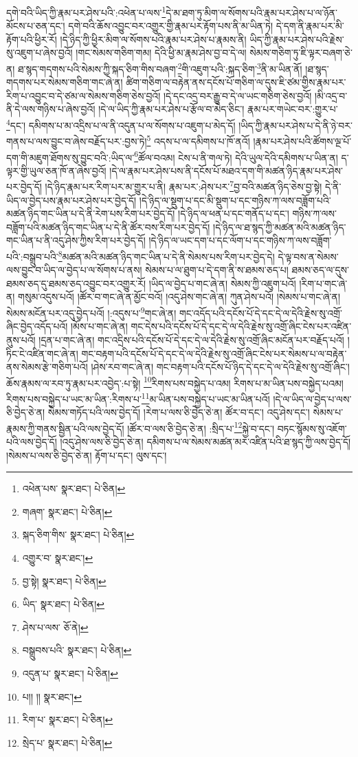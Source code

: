 དགེ་བའི་ཡིད་ཀྱི་རྣམ་པར་ཤེས་པའི་:འཕེན་པ་ལས་\footnote{འཕེན་པས་  སྣར་ཐང་།  པེ་ཅིན། }དེ་མ་ཐག་ཏུ་མིག་ལ་སོགས་པའི་རྣམ་པར་ཤེས་པ་ལ་ཉོན་མོངས་པ་ཅན་དང་། དགེ་བའི་ཆོས་འབྱུང་བར་འགྱུར་གྱི་རྣམ་པར་རྟོག་པས་ནི་མ་ཡིན་ཏེ། དེ་དག་ནི་རྣམ་པར་མི་རྟོག་པའི་ཕྱིར་རོ། །དེ་ཉིད་ཀྱི་ཕྱིར་མིག་ལ་སོགས་པའི་རྣམ་པར་ཤེས་པ་རྣམས་ནི། ཡིད་ཀྱི་རྣམ་པར་ཤེས་པའི་རྗེས་སུ་འཇུག་པ་ཞེས་བྱའོ། །གང་སེམས་གཅིག་གམ། དེའི་ཕྱི་མ་རྣམ་ཤེས་བྱ་བ་དེ་ལ། སེམས་གཅིག་ཏུ་ཇི་ལྟར་བཞག་ཅེ་ན། ཐ་སྙད་གདགས་པའི་སེམས་ཀྱི་སྐད་ཅིག་གིས་བཞག་\footnote{གཞག་  སྣར་ཐང་།  པེ་ཅིན། }གི་འཇུག་པའི་:སྐད་ཅིག་\footnote{སྐད་ཅིག་གིས་  སྣར་ཐང་།  པེ་ཅིན། }ནི་མ་ཡིན་ནོ། །ཐ་སྙད་གདགས་པར་སེམས་གཅིག་གང་ཞེ་ན། ཚིག་གཅིག་ལ་བརྟེན་ནས་དངོས་པོ་གཅིག་ལ་དུས་ཇི་ཙམ་གྱིས་རྣམ་པར་རིག་པ་འབྱུང་བ་དེ་ཙམ་ལ་སེམས་གཅིག་ཅེས་བྱའོ། །དེ་དང་འདྲ་བར་རྒྱུ་བ་དེ་ལ་ཡང་གཅིག་ཅེས་བྱའོ། །མི་འདྲ་བ་ནི་དེ་ལས་གཉིས་པ་ཞེས་བྱའོ། །དེ་ལ་ཡིད་ཀྱི་རྣམ་པར་ཤེས་པ་རྩོལ་བ་མེད་ཅིང་། རྣམ་པར་གཡེང་བར་:གྱུར་པ་\footnote{འགྱུར་བ་  སྣར་ཐང་། }དང་། དམིགས་པ་མ་འདྲིས་པ་ལ་ནི་འདུན་པ་ལ་སོགས་པ་འཇུག་པ་མེད་དོ། །ཡིད་ཀྱི་རྣམ་པར་ཤེས་པ་དེ་ནི་ཉེ་བར་གནས་པ་ལས་བྱུང་བ་ཞེས་བརྗོད་པར་:བྱས་ཏེ།\footnote{བྱ་སྟེ།  སྣར་ཐང་།  པེ་ཅིན། } འདས་པ་ལ་དམིགས་པ་ཁོ་ནའོ། །རྣམ་པར་ཤེས་པའི་ཚོགས་ལྔ་པོ་དག་གི་མཇུག་ཐོགས་སུ་བྱུང་བའི་:ཡིད་ལ་\footnote{ཡིད་  སྣར་ཐང་།  པེ་ཅིན། }ཚོལ་བའམ། ངེས་པ་ནི་གལ་ཏེ། དེའི་ཡུལ་དེའི་དམིགས་པ་ཡིན་ན། ད་ལྟར་གྱི་ཡུལ་ཅན་ཁོ་ན་ཞེས་བྱའོ། །དེ་ལ་རྣམ་པར་ཤེས་པས་ནི་དངོས་པོ་མཐའ་དག་གི་མཚན་ཉིད་རྣམ་པར་ཤེས་པར་བྱེད་དོ། །དེ་ཉིད་རྣམ་པར་རིག་པར་མ་གྱུར་པ་ནི། རྣམ་པར་:ཤེས་པར་\footnote{ཤེས་པ་ལས་  ཅོ་ནེ། }བྱ་བའི་མཚན་ཉིད་ཅེས་བྱ་སྟེ། དེ་ནི་ཡིད་ལ་བྱེད་པས་རྣམ་པར་ཤེས་པར་བྱེད་དོ། །དེ་ཉིད་ལ་སྡུག་པ་དང་མི་སྡུག་པ་དང་གཉིས་ཀ་ལས་བཟློག་པའི་མཚན་ཉིད་གང་ཡིན་པ་དེ་ནི་རེག་པས་རིག་པར་བྱེད་དོ། །དེ་ཉིད་ལ་ཕན་པ་དང་གནོད་པ་དང་། གཉིས་ཀ་ལས་བཟློག་པའི་མཚན་ཉིད་གང་ཡིན་པ་དེ་ནི་ཚོར་བས་རིག་པར་བྱེད་དོ། །དེ་ཉིད་ལ་ཐ་སྙད་ཀྱི་མཚན་མའི་མཚན་ཉིད་གང་ཡིན་པ་ནི་འདུ་ཤེས་ཀྱིས་རིག་པར་བྱེད་དོ། །དེ་ཉིད་ལ་ཡང་དག་པ་དང་ལོག་པ་དང་གཉིས་ཀ་ལས་བཟློག་པའི་:བསྒྲུབ་པའི་\footnote{བསྒྲུབས་པའི་  སྣར་ཐང་།  པེ་ཅིན། }མཚན་མའི་མཚན་ཉིད་གང་ཡིན་པ་དེ་ནི་སེམས་པས་རིག་པར་བྱེད་དེ། དེ་ལྟ་བས་ན་སེམས་ལས་བྱུང་བ་ཡིད་ལ་བྱེད་པ་ལ་སོགས་པ་ནས། སེམས་པ་ལ་ཐུག་པ་དེ་དག་ནི་ས་ཐམས་ཅད་པ། ཐམས་ཅད་ལ་དུས་ཐམས་ཅད་དུ་ཐམས་ཅད་འབྱུང་བར་འགྱུར་རོ། །ཡིད་ལ་བྱེད་པ་གང་ཞེ་ན། སེམས་ཀྱི་འཇུག་པའོ། །རིག་པ་གང་ཞེ་ན། གསུམ་འདུས་པའོ། །ཚོར་བ་གང་ཞེ་ན་མྱོང་བའོ། །འདུ་ཤེས་གང་ཞེ་ན། ཀུན་ཤེས་པའོ། །སེམས་པ་གང་ཞེ་ན། སེམས་མངོན་པར་འདུ་བྱེད་པའོ། །:འདུས་པ་\footnote{འདུན་པ་  སྣར་ཐང་།  པེ་ཅིན། }གང་ཞེ་ན། གང་འདོད་པའི་དངོས་པོ་དེ་དང་དེ་ལ་དེའི་རྗེས་སུ་འགྲོ་ཞིང་བྱེད་འདོད་པའོ། །མོས་པ་གང་ཞེ་ན། གང་དེས་པའི་དངོས་པོ་དེ་དང་དེ་ལ་དེའི་རྗེས་སུ་འགྲོ་ཞིང་ངེས་པར་འཛིན་ནུས་པའོ། །དྲན་པ་གང་ཞེ་ན། གང་འདྲིས་པའི་དངོས་པོ་དེ་དང་དེ་ལ་དེའི་རྗེས་སུ་འགྲོ་ཞིང་མངོན་པར་བརྗོད་པའོ། །ཏིང་ངེ་འཛིན་གང་ཞེ་ན། གང་བརྟག་པའི་དངོས་པོ་དེ་དང་དེ་ལ་དེའི་རྗེས་སུ་འགྲོ་ཞིང་ངེས་པར་སེམས་པ་ལ་བརྟེན་ནས་སེམས་རྩེ་གཅིག་པའོ། །ཤེས་རབ་གང་ཞེ་ན། གང་བརྟག་པའི་དངོས་པོ་ཉིད་དེ་དང་དེ་ལ་དེའི་རྗེས་སུ་འགྲོ་ཞིང་། ཆོས་རྣམས་ལ་རབ་ཏུ་རྣམ་པར་འབྱེད་:པ་སྟེ། \footnote{པ།། །།   སྣར་ཐང་། }རིགས་པས་བསྐྱེད་པ་འམ། རིགས་པ་མ་ཡིན་པས་བསྐྱེད་པའམ། རིགས་པས་བསྐྱེད་པ་ཡང་མ་ཡིན་:རིགས་པ་\footnote{རིག་པ་  སྣར་ཐང་།  པེ་ཅིན། }མ་ཡིན་པས་བསྐྱེད་པ་ཡང་མ་ཡིན་པའོ། །དེ་ལ་ཡིད་ལ་བྱེད་པ་ལས་ཅི་བྱེད་ཅེ་ན། སེམས་གཏོད་པའི་ལས་བྱེད་དོ། །རེག་པ་ལས་ཅི་བྱེད་ཅེ་ན། ཚོར་བ་དང་། འདུ་ཤེས་དང་། སེམས་པ་རྣམས་ཀྱི་གནས་སྦྱིན་པའི་ལས་བྱེད་དོ། །ཚོར་བ་ལས་ཅི་བྱེད་ཅེ་ན། :སྲིད་པ་\footnote{སྲེད་པ་  སྣར་ཐང་།  པེ་ཅིན། }སྐྱེ་བ་དང་། བཏང་སྙོམས་སུ་འཇོག་པའི་ལས་བྱེད་དོ། །འདུ་ཤེས་ལས་ཅི་བྱེད་ཅེ་ན། དམིགས་པ་ལ་སེམས་མཚན་མར་འཛིན་པའི་ཐ་སྙད་ཀྱི་ལས་བྱེད་དོ། །སེམས་པ་ལས་ཅི་བྱེད་ཅེ་ན། རྟོག་པ་དང་། ལུས་དང་། 